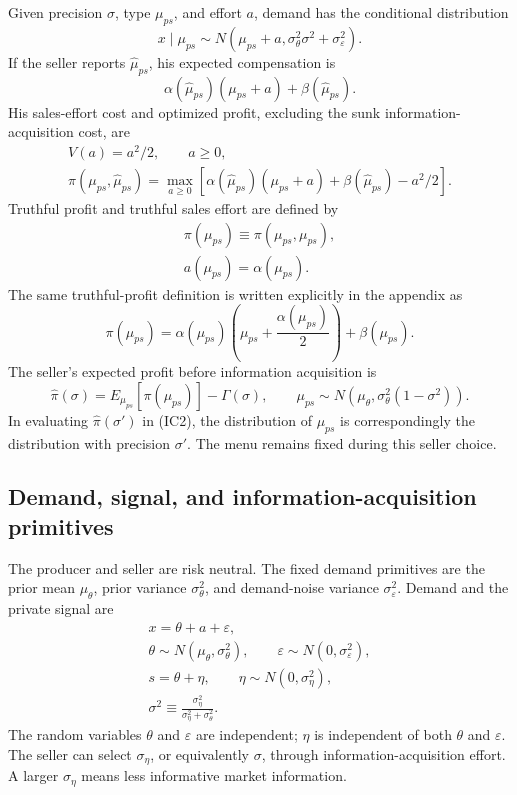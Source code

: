 \documentclass{article}
\begin{document}
Given precision $\sigma$, type $\mu_{ps}$, and effort $a$, demand has the conditional distribution
\begin{equation*}
x\mid\mu_{ps}\sim N\!\left(\mu_{ps}+a,
\sigma_\theta^2\sigma^2+\sigma_\varepsilon^2\right).
\end{equation*}
If the seller reports $\widehat{\mu}_{ps}$, his expected compensation is
\begin{equation*}
\alpha(\widehat{\mu}_{ps})(\mu_{ps}+a)+\beta(\widehat{\mu}_{ps}).
\end{equation*}
His sales-effort cost and optimized profit, excluding the sunk information-acquisition cost, are
\begin{gather*}
V(a)=a^2/2,\qquad a\geq 0,\\
\pi(\mu_{ps},\widehat{\mu}_{ps})
=\max_{a\geq 0}
\left[\alpha(\widehat{\mu}_{ps})(\mu_{ps}+a)
+\beta(\widehat{\mu}_{ps})-a^2/2\right].
\end{gather*}
Truthful profit and truthful sales effort are defined by
\begin{gather*}
\pi(\mu_{ps})\equiv\pi(\mu_{ps},\mu_{ps}),\\
a(\mu_{ps})=\alpha(\mu_{ps}).
\end{gather*}
The same truthful-profit definition is written explicitly in the appendix as
\begin{equation*}
\pi(\mu_{ps})
=\alpha(\mu_{ps})\left(\mu_{ps}+\frac{\alpha(\mu_{ps})}{2}\right)
+\beta(\mu_{ps}).
\end{equation*}
The seller's expected profit before information acquisition is
\begin{equation*}
\widehat{\pi}(\sigma)=E_{\mu_{ps}}[\pi(\mu_{ps})]-\Gamma(\sigma),
\qquad
\mu_{ps}\sim N\!\left(\mu_\theta,\sigma_\theta^2(1-\sigma^2)\right).
\end{equation*}
In evaluating $\widehat{\pi}(\sigma')$ in (IC2), the distribution of $\mu_{ps}$ is correspondingly the distribution with precision $\sigma'$. The menu remains fixed during this seller choice.

\subsection*{Demand, signal, and information-acquisition primitives}

The producer and seller are risk neutral. The fixed demand primitives are the prior mean $\mu_\theta$, prior variance $\sigma_\theta^2$, and demand-noise variance $\sigma_\varepsilon^2$. Demand and the private signal are
\begin{gather*}
x=\theta+a+\varepsilon,\\
\theta\sim N(\mu_\theta,\sigma_\theta^2),
\qquad \varepsilon\sim N(0,\sigma_\varepsilon^2),\\
s=\theta+\eta,
\qquad \eta\sim N(0,\sigma_\eta^2),\\
\sigma^2\equiv\frac{\sigma_\eta^2}{\sigma_\eta^2+\sigma_\theta^2}.
\end{gather*}
The random variables $\theta$ and $\varepsilon$ are independent; $\eta$ is independent of both $\theta$ and $\varepsilon$. The seller can select $\sigma_\eta$, or equivalently $\sigma$, through information-acquisition effort. A larger $\sigma_\eta$ means less informative market information.
\end{document}
